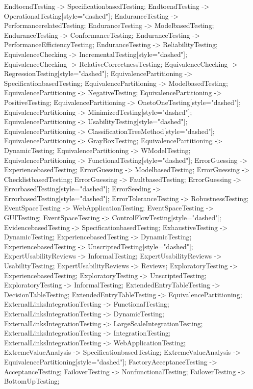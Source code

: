 \documentclass{article}
\begin{document}
{EndtoendTesting -> SpecificationbasedTesting;
EndtoendTesting -> OperationalTesting[style="dashed"];
EnduranceTesting -> PerformancerelatedTesting;
EnduranceTesting -> ModelbasedTesting;
EnduranceTesting -> ConformanceTesting;
EnduranceTesting -> PerformanceEfficiencyTesting;
EnduranceTesting -> ReliabilityTesting;
EquivalenceChecking -> IncrementalTesting[style="dashed"];
EquivalenceChecking -> RelativeCorrectnessTesting;
EquivalenceChecking -> RegressionTesting[style="dashed"];
EquivalencePartitioning -> SpecificationbasedTesting;
EquivalencePartitioning -> ModelbasedTesting;
EquivalencePartitioning -> NegativeTesting;
EquivalencePartitioning -> PositiveTesting;
EquivalencePartitioning -> OnetoOneTesting[style="dashed"];
EquivalencePartitioning -> MinimizedTesting[style="dashed"];
EquivalencePartitioning -> UsabilityTesting[style="dashed"];
EquivalencePartitioning -> ClassificationTreeMethod[style="dashed"];
EquivalencePartitioning -> GrayBoxTesting;
EquivalencePartitioning -> DynamicTesting;
EquivalencePartitioning -> WModelTesting;
EquivalencePartitioning -> FunctionalTesting[style="dashed"];
ErrorGuessing -> ExperiencebasedTesting;
ErrorGuessing -> ModelbasedTesting;
ErrorGuessing -> ChecklistbasedTesting;
ErrorGuessing -> FaultbasedTesting;
ErrorGuessing -> ErrorbasedTesting[style="dashed"];
ErrorSeeding -> ErrorbasedTesting[style="dashed"];
ErrorToleranceTesting -> RobustnessTesting;
EventSpaceTesting -> WebApplicationTesting;
EventSpaceTesting -> GUITesting;
EventSpaceTesting -> ControlFlowTesting[style="dashed"];
EvidencebasedTesting -> SpecificationbasedTesting;
ExhaustiveTesting -> DynamicTesting;
ExperiencebasedTesting -> DynamicTesting;
ExperiencebasedTesting -> UnscriptedTesting[style="dashed"];
ExpertUsabilityReviews -> InformalTesting;
ExpertUsabilityReviews -> UsabilityTesting;
ExpertUsabilityReviews -> Reviews;
ExploratoryTesting -> ExperiencebasedTesting;
ExploratoryTesting -> UnscriptedTesting;
ExploratoryTesting -> InformalTesting;
ExtendedEntryTableTesting -> DecisionTableTesting;
ExtendedEntryTableTesting -> EquivalencePartitioning;
ExternalLinksIntegrationTesting -> FunctionalTesting;
ExternalLinksIntegrationTesting -> DynamicTesting;
ExternalLinksIntegrationTesting -> LargeScaleIntegrationTesting;
ExternalLinksIntegrationTesting -> IntegrationTesting;
ExternalLinksIntegrationTesting -> WebApplicationTesting;
ExtremeValueAnalysis -> SpecificationbasedTesting;
ExtremeValueAnalysis -> EquivalencePartitioning[style="dashed"];
FactoryAcceptanceTesting -> AcceptanceTesting;
FailoverTesting -> NonfunctionalTesting;
FailoverTesting -> BottomUpTesting;
}
\end{document}

